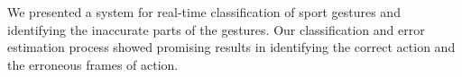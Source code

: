 We presented a system for real-time classification of sport gestures and identifying the inaccurate parts of the gestures. Our classification and error estimation process showed promising results in identifying the correct action and the erroneous frames of action. 